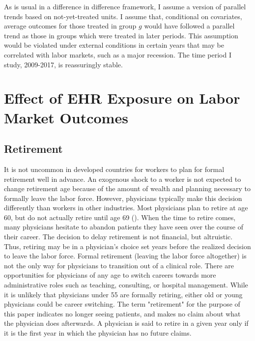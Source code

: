 \documentclass[11pt]{article}
\begin{document}
As is usual in a difference in difference framework, I assume a version of parallel trends based on not-yet-treated units. I assume that, conditional on covariates, average outcomes for those treated in group $g$ would have followed a parallel trend as those in groups which were treated in later periods. This assumption would be violated under external conditions in certain years that may be correlated with labor markets, such as a major recession. The time period I study, 2009-2017, is reassuringly stable.







\section{Effect of EHR Exposure on Labor Market Outcomes}

\subsection{Retirement}

It is not uncommon in developed countries for workers to plan for formal retirement well in advance. An exogenous shock to a worker is not expected to change retirement age because of the amount of wealth and planning necessary to formally leave the labor force. However, physicians typically make this decision differently than workers in other industries. Most physicians plan to retire at age 60, but do not actually retire until age 69 (\cite{collier2017challenges}). When the time to retire comes, many physicians hesitate to abandon patients they have seen over the course of their career. The decision to delay retirement is not financial, but altruistic. Thus, retiring may be in a physician's choice set years before the realized decision to leave the labor force. Formal retirement (leaving the labor force altogether) is not the only way for physicians to transition out of a clinical role. There are opportunities for physicians of any age to switch careers towards more administrative roles such as teaching, consulting, or hospital management. While it is unlikely that physicians under 55 are formally retiring, either old or young physicians could be career switching. The term "retirement" for the purpose of this paper indicates no longer seeing patients, and makes no claim about what the physician does afterwards. A physician is said to retire in a given year only if it is the first year in which the physician has no future claims.
\end{document}
